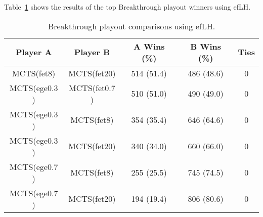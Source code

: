 \documentclass{article}
\begin{document}

Table~\ref{tbl:bt-efLH-toptourney} shows the results of the top Breakthrough playout winners using efLH.

\begin{table}[h!]
\begin{center}
\begin{tabular}{|c|c|ccc|}
\hline
Player A & Player B                  & A Wins (\%)  & B Wins (\%)  & Ties \\ 
\hline
MCTS(fet$8$)   & MCTS(fet$20$)       & 514 (51.4)   & 486 (48.6)   & 0    \\
MCTS(ege$0.3$) & MCTS(fet$0.7$)      & 510 (51.0)   & 490 (49.0)   & 0    \\
\hline
MCTS(ege$0.3$) & MCTS(fet$8$)        & 354 (35.4)   & 646 (64.6)   & 0    \\
MCTS(ege$0.3$) & MCTS(fet$20$)       & 340 (34.0)   & 660 (66.0)   & 0    \\
MCTS(ege$0.7$) & MCTS(fet$8$)        & 255 (25.5)   & 745 (74.5)   & 0    \\
MCTS(ege$0.7$) & MCTS(fet$20$)       & 194 (19.4)   & 806 (80.6)   & 0    \\
\hline
\end{tabular}
\end{center}
\caption{Breakthrough playout comparisons using efLH. \label{tbl:bt-efLH-toptourney}}
\end{table}
\end{document}
